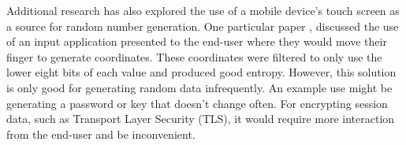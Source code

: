 
Additional research has also explored the use of a mobile device's touch 
screen as a source for random number generation.  One particular paper 
\cite{montville2003random}, discussed the use of an input application presented 
to the end-user where they would move their finger to generate 
coordinates.  These coordinates were filtered to only use the lower 
eight bits of each value and produced good entropy.  However, this 
solution is only good for generating random data infrequently.  An 
example use might be generating a password or key that doesn't change
often.  For encrypting session data, such as Transport Layer Security (TLS), it would require
more interaction from the end-user and be inconvenient.

